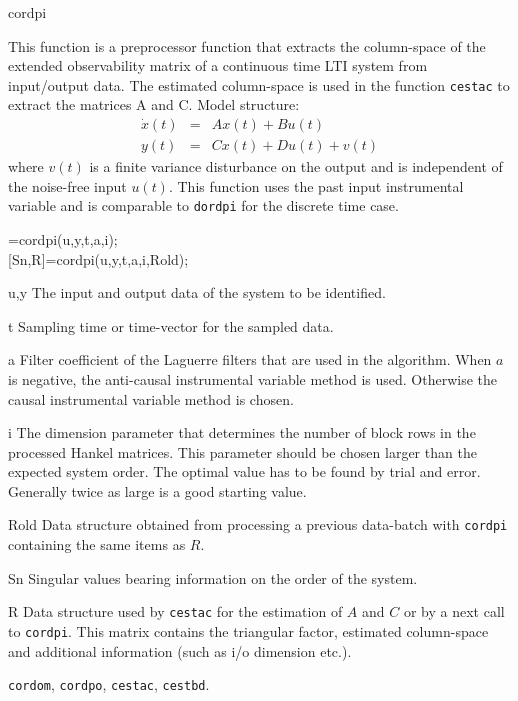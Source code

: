 \documentclass{book}
\newcommand{\dordpi}{\texttt{dordpi}}
\newcommand{\cordom}{\texttt{cordom}}
\newcommand{\cordpo}{\texttt{cordpo}}
\newcommand{\cordpi}{\texttt{cordpi}}
\newcommand{\cestac}{\texttt{cestac}}
\newcommand{\cestbd}{\texttt{cestbd}}
\begin{document}
\begin{command}{cordpi}
\begin{purpose}
    This function is a preprocessor function that extracts the
    column-space of the extended observability matrix of a continuous
    time LTI system from input/output data. The estimated column-space
    is used in the function {\cestac} to extract the matrices A and C.
  Model structure:
  \begin{eqnarray*}
    \dot{x}(t) &=&  A x(t) + B u(t)\\
    y(t) &=& C x(t) + Du(t) + v(t)
  \end{eqnarray*}
  where $v(t)$ is a finite variance disturbance on the output and is
  independent of the noise-free input $u(t)$. This function uses the
  past input instrumental variable and is comparable to {\dordpi} for
  the discrete time case.
\end{purpose}
  
\begin{syntax}
[Sn,R]=cordpi(u,y,t,a,i);\\[0pt]
[Sn,R]=cordpi(u,y,t,a,i,Rold);
\end{syntax}

\begin{inputs}
\item[u,y] The input and output data of the system to be identified.
\item[t] Sampling time or time-vector for the sampled data. 
\item[a] Filter coefficient of the Laguerre filters that are used in
  the algorithm. When $a$ is negative, the anti-causal instrumental
  variable method is used. Otherwise the causal instrumental variable
  method is chosen.
\item[i] The dimension parameter that determines the number of block
  rows in the processed Hankel matrices. This parameter should be
  chosen larger than the expected system order. The optimal value has
  to be found by trial and error. Generally twice as large is a good
  starting value.
\item[Rold] Data structure obtained from processing a previous
  data-batch with {\cordpi} containing the same items as $R$.
\end{inputs}

\begin{outputs}
\item[Sn] Singular values bearing information on the order of the
  system.
\item[R] Data structure used by {\cestac} for the estimation of $A$
  and $C$ or by a next call to {\cordpi}. This matrix contains the
  triangular factor, estimated column-space and additional information
  (such as i/o dimension etc.).
\end{outputs}
         
\begin{seealso}
{\cordom}, {\cordpo}, {\cestac}, {\cestbd}.
\end{seealso}
\end{command}%
\end{document}
